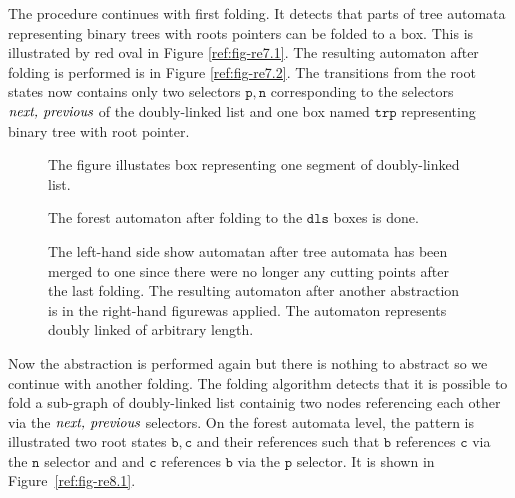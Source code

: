 {The procedure continues with first folding.
It detects that parts of tree automata representing binary trees with roots pointers can be folded to a box.
This is illustrated by red oval in Figure \ref{ref:fig-re7.1}.
The resulting automaton after folding is performed is in Figure \ref{ref:fig-re7.2}.
The transitions from the root states now contains only two selectors $\mathtt{p,n}$ corresponding to
the selectors $\emph{next, previous}$ of the doubly-linked list and one box named $\mathtt{trp}$
representing binary tree with root pointer.


\begin{figure}[bt]
\begin{center}
      
\caption{The figure illustates box representing one segment of doubly-linked list.}
\label{ref:fig-re8.1}
      
\caption{The forest automaton after folding to the $\mathtt{dls}$ boxes is done.}
\label{ref:fig-re8.2}
\end{center}
\end{figure}

\begin{figure}[bth!]
\begin{center}
  \begin{subfigure}[b]{0.49\linewidth}
      
  \end{subfigure}
  \begin{subfigure}[b]{0.49\linewidth}
      
  \end{subfigure}
\caption{The left-hand side show automatan after tree automata has been merged to one since there were no longer any cutting points after the last folding.
The resulting automaton after another abstraction is in the right-hand figurewas applied. The automaton represents doubly linked of arbitrary length.}
\label{ref:fig-re9}
\end{center}
\end{figure}

Now the abstraction is performed again but there is nothing to abstract so we continue with another folding.
The folding algorithm detects that it is possible to fold a sub-graph of doubly-linked list containig two nodes
referencing each other via the $\emph{next, previous}$ selectors.
On the forest automata level, the pattern is illustrated two root states $\mathtt{b,c}$ and their references
such that $\mathtt{b}$ references $\mathtt{c}$ via the $\mathtt{n}$ selector and and $\mathtt{c}$ references $\mathtt{b}$ via the $\mathtt{p}$ selector.
It is shown in Figure~\ref{ref:fig-re8.1}.

}
